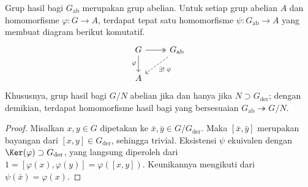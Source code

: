 \begin{lemma}\label{prop:abelianization}
	Grup hasil bagi $G_{\mathrm{ab}}$ merupakan grup abelian. Untuk setiap grup abelian $A$ dan homomorfisme $\varphi: G \to A$, terdapat tepat satu homomorfisme $\psi: G_{\mathrm{ab}} \to A$ yang membuat diagram berikut komutatif.
	\[ \begin{tikzcd}
		G \arrow[twoheadrightarrow, r] \arrow[d, "\varphi"'] & G_{\mathrm{ab}} \arrow[dashed, ld, "{\exists ! \; \psi}"] \\
		A &
	\end{tikzcd} \]
	Khususnya, grup hasil bagi $G/N$ abelian jika dan hanya jika $N \supset G_\text{der}$; dengan demikian, terdapat homomorfisme hasil bagi yang bersesuaian $G_{\mathrm{ab}} \twoheadrightarrow G/N$.
\end{lemma}
\begin{proof}
	Misalkan $x,y \in G$ dipetakan ke $\bar{x}, \bar{y} \in G/G_\text{der}$. Maka $[\bar{x}, \bar{y}]$ merupakan bayangan dari $[x,y] \in G_\text{der}$, sehingga trivial. Eksistensi $\psi$ ekuivalen dengan $\Ker(\varphi) \supset G_\text{der}$, yang langsung diperoleh dari $1 = [\varphi(x), \varphi(y)] = \varphi([x,y])$. Keunikannya mengikuti dari $\psi(\bar{x}) = \varphi(x)$.
\end{proof}

